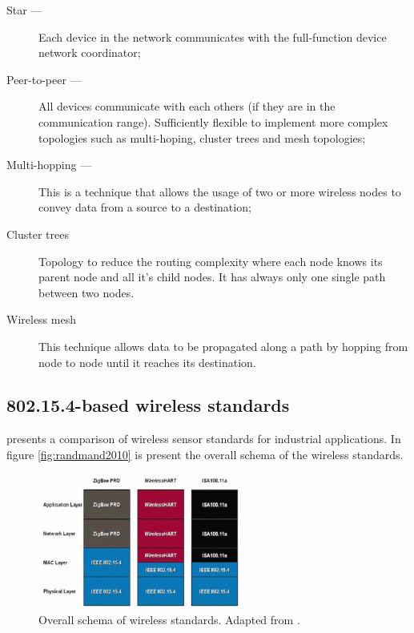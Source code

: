 \begin{description}
	\item[Star ---] Each device in the network communicates with the full-function device network coordinator;
	
	\item[Peer-to-peer ---] All devices communicate with each others (if they are in the communication range). Sufficiently flexible to implement more complex topologies such as multi-hoping, cluster trees and mesh topologies;
	
	\item[Multi-hopping ---] This is a technique that allows the usage of two or more wireless nodes to convey data from a source to a destination;
	
	\item[Cluster trees] Topology to reduce the routing complexity where each node knows its parent node and all it's child nodes. It has always only one single path between two nodes.
	
	\item[Wireless mesh] This technique allows data to be propagated along a path by hopping from node to node until it reaches its destination.
		
\end{description}

\subsection{802.15.4-based wireless standards}

\cite{Radmand2010} presents a comparison of wireless sensor standards for industrial applications. In figure \ref{fig:randmand2010} is present the overall schema of the wireless standards.


\begin{figure}[h!]
	\centering
	\includegraphics[width=0.6\textwidth,keepaspectratio]{figures/radmand2010}
	\caption{Overall schema of wireless standards. Adapted from \cite{radmand2010}.}
	\label{fig:radmand2010}
\end{figure}


